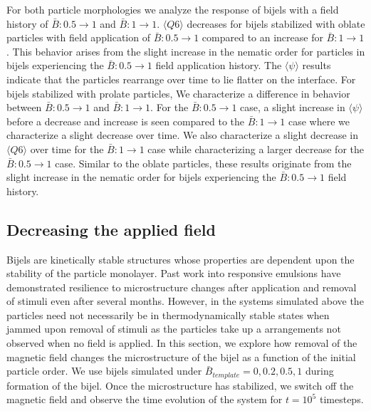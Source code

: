 For both particle morphologies we analyze the response of bijels with a
field history of $\bar{B}: 0.5 \rightarrow 1$ and
$\bar{B}: 1 \rightarrow 1$.
$\langle Q6 \rangle$ decreases for bijels stabilized with oblate particles with
field application of $\bar{B}: 0.5 \rightarrow 1$ compared to an
increase for $\bar{B}: 1 \rightarrow 1$. This behavior arises from the
slight increase in the nematic order for particles in bijels
experiencing the $\bar{B}: 0.5 \rightarrow 1$ field application
history. The $\langle \psi \rangle$ results indicate that the
particles rearrange over time to lie flatter on the interface. For
bijels stabilized with prolate particles, We characterize a difference
in behavior between $\bar{B}: 0.5 \rightarrow 1$ and
$\bar{B}: 1 \rightarrow 1$. For the $\bar{B}: 0.5 \rightarrow 1$
case, a slight increase in $\langle \psi \rangle$ before a
decrease and increase is seen compared to the $\bar{B}: 1 \rightarrow 1$ case
where we characterize a slight decrease over time. We also characterize
a slight decrease in $\langle Q6 \rangle$ over time for the
$\bar{B}: 1 \rightarrow 1$ case while characterizing a larger decrease
for the $\bar{B}: 0.5 \rightarrow 1$ case. Similar to the oblate
particles, these results originate from the slight increase in the
nematic order for bijels experiencing the $\bar{B}: 0.5 \rightarrow 1$
field history.

\subsection{Decreasing the applied
field}\label{decreasing-the-applied-field}

Bijels are kinetically stable structures whose properties are dependent
upon the stability of the particle monolayer. Past work into responsive
emulsions have demonstrated resilience to microstructure changes after
application and removal of stimuli even after several months. \cite{cui_stabilizing_2013} However,
in the systems simulated above the particles need not necessarily be in
thermodynamically stable states when jammed upon removal of stimuli as
the particles take up a arrangements not observed when no field is
applied. In this section, we explore how removal of the magnetic field
changes the microstructure of the bijel as a function of the initial
particle order. We use bijels simulated under
$\bar{B}_{template} = 0, 0.2, 0.5, 1$ during formation of the bijel. Once
the microstructure has stabilized, we switch off the magnetic field and
observe the time evolution of the system for $t = 10^5$ timesteps.

